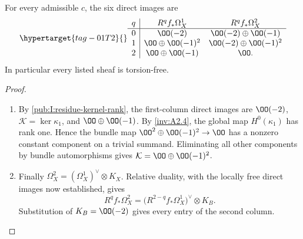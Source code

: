 \begin{proposition}\hypertarget{tag-01RT}{}\label{inv:A1.3}\label{wb:prop:absolute-cotangent-direct-images}

For every admissible $c$, the six direct images are
\begin{equation}\hypertarget{tag-01T2}{}\label{inv:eq:A-absolute-table}
\begin{array}{c|cc}
q&R^qf_*\Omega_X^1&R^qf_*\Omega_X^2\\\hline
0&\OO(-2)&\OO(-2)\oplus\OO(-1)\\
1&\OO\oplus\OO(-1)^2&\OO(-2)\oplus\OO(-1)^2\\
2&\OO\oplus\OO(-1)&\OO.
\end{array}
\end{equation}
In particular every listed sheaf is torsion-free.
\end{proposition}


\begin{proof}
\begin{enumerate}[label=\arabic*.,leftmargin=*]
\item By \cref{pub:I:residue-kernel-rank}, the first-column direct
images are $\OO(-2)$, $\mathcal K=\ker\kappa_1$, and
$\OO\oplus\OO(-1)$. By \cref{inv:A2.4}, the global map
$H^0(\kappa_1)$ has rank one. Hence the bundle map
$\OO^2\oplus\OO(-1)^2\to\OO$ has a nonzero constant component
on a trivial summand. Eliminating all other components by bundle
automorphisms gives $\mathcal K=\OO\oplus\OO(-1)^2$.

\item Finally $\Omega_X^2=(\Omega_X^1)^\vee\otimes K_X$. Relative
duality, with the locally free direct images now established, gives
\[
R^qf_*\Omega_X^2
=\bigl(R^{2-q}f_*\Omega_X^1\bigr)^\vee\otimes K_B.
\]
Substitution of $K_B=\OO(-2)$ gives every entry of the second column.
\end{enumerate}
\end{proof}
